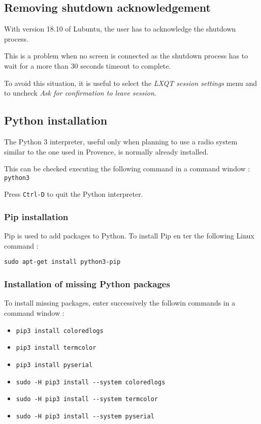 \documentclass[a4paper]{ffco-rapport}
\begin{document}
	\subsection{Removing shutdown acknowledgement}
		With version 18.10 of Lubuntu, the user has to acknowledge the shutdown process.
		
		This is a problem when no screen is connected as the shutdown process has to wait for a more than 30 seconds timeout to complete.
		
		To avoid this situation, it is useful to select the \emph{LXQT session settings} menu and to uncheck \emph{Ask for confirmation to leave session}.

	\subsection{Python installation}
		The Python 3 interpreter, useful only when planning to use a radio system similar to the one used in Provence, is normally already installed.

		This can be checked executing the following command in a command window : \verb|python3|

		Press \verb|Ctrl-D| to quit the Python interpreter.
		
  	\subsubsection{Pip installation}
			Pip is used to add packages to Python. To install Pip en ter the following Linux command :
		
			\verb|sudo apt-get install python3-pip|
			
		\subsubsection{Installation of missing Python packages}
			To install missing packages, enter successively the followin commands in a command window :
			
			\begin{itemize}
				\item \verb|pip3 install coloredlogs|
				\item \verb|pip3 install termcolor|
				\item \verb|pip3 install pyserial|
				\item \verb|sudo -H pip3 install --system coloredlogs|
				\item \verb|sudo -H pip3 install --system termcolor|
				\item \verb|sudo -H pip3 install --system pyserial|
			\end{itemize}
\end{document}
